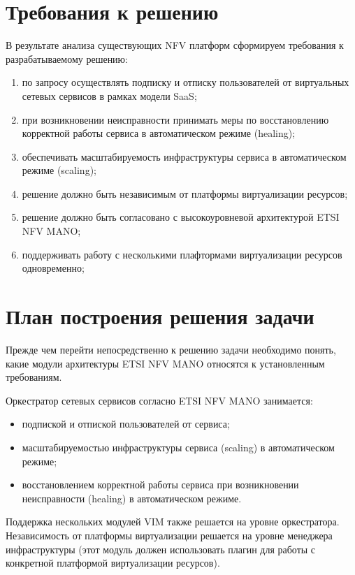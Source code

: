 \documentclass[oneside,final,14pt,a4paper]{extreport}
\begin{document}
\section{Требования к решению}
\label{sec:platform_requirements}
В результате анализа существующих NFV платформ сформируем требования к разрабатываемому решению:
\begin{enumerate}
	\item по запросу осуществлять подписку и отписку пользователей от виртуальных сетевых сервисов в рамках модели SaaS;
	\item при возникновении неисправности принимать меры по восстановлению корректной работы сервиса в автоматическом режиме (healing);
	\item обеспечивать масштабируемость инфраструктуры сервиса в автоматическом режиме (scaling);
	\item решение должно быть независимым от платформы виртуализации ресурсов;
	\item решение должно быть согласовано с высокоуровневой архитектурой ETSI NFV MANO;
	\item поддерживать работу с несколькими плафтормами виртуализации ресурсов одновременно;
\end{enumerate}


\section{План построения решения задачи}
Прежде чем перейти непосредственно к решению задачи необходимо понять, какие модули архитектуры ETSI NFV MANO относятся к установленным требованиям.

Оркестратор сетевых сервисов согласно ETSI NFV MANO занимается:
\begin{itemize}
	\item подпиской и отпиской пользователей от сервиса;
	\item масштабируемостью инфраструктуры сервиса (scaling) в автоматическом режиме;
	\item восстановлением корректной работы сервиса при возникновении неисправности (healing) в автоматическом режиме.
\end{itemize}

Поддержка нескольких модулей VIM также решается на уровне оркестратора. Независимость от платформы виртуализации решается на уровне менеджера инфраструктуры (этот модуль должен использовать плагин для работы с конкретной платформой виртуализации ресурсов).
\end{document}

